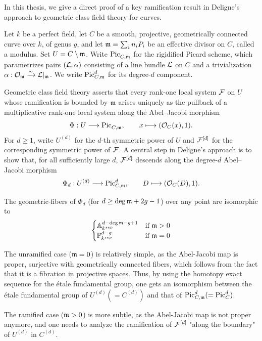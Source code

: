 In this thesis, we give a direct proof of a key ramification result in Deligne's approach to geometric class field theory for curves.

Let $k$ be a perfect field, let $C$ be a smooth, projective, geometrically connected curve over $k$, of genus $g$, and let $\mdls=\sum_i n_iP_i$ be an effective divisor on $C$, called a modulus. Set $U=C\setminus\mdls$.
Write $\PicCm$ for the rigidified Picard scheme, which parametrizes pairs $(\cL,\alpha)$ consisting of a line bundle $\cL$ on $C$ and a trivialization $\alpha:\cO_\mdls\xrightarrow{\sim}\cL|_\mdls$. We write $\PicCm[d]$ for its degree-$d$ component.

Geometric class field theory asserts that every rank-one local system $\cF$ on $U$ whose ramification is bounded by $\mdls$ arises uniquely as the pullback of a multiplicative rank-one local system along the Abel--Jacobi morphism
\[
\Phi:U\longrightarrow\PicCm,
\qquad x\longmapsto(\cO_C(x),1).
\]
For $d\geq1$, write $U^{(d)}$ for the $d$-th symmetric power of $U$ and $\cF^{[d]}$ for the corresponding symmetric power of $\cF$.
A central step in Deligne's approach is to show that, for all sufficiently large $d$, $\cF^{[d]}$ descends along the degree-$d$ Abel--Jacobi morphism
\[
\Phi_d:U^{(d)}\longrightarrow\PicCm[d],
\qquad D\longmapsto(\cO_C(D),1).
\]

The geometric-fibers of $\Phi_d$ (for $d \geq \deg \mdls +  2g - 1$) over any point are isomorphic to 
$$
\begin{cases}
\mathbb{A}_{k^{sep}}^{d - \deg \mdls - g + 1} & \text{if } \mdls > 0 \\
\mathbb{P}_{k^{sep}}^{d - g} & \text{if } \mdls = 0
\end{cases}
$$

The unramified case ($\mdls = 0$) is relatively simple, as the Abel-Jacobi map is proper, surjective with geometrically connected fibers, which follows from the fact that it is a fibration in projective spaces.
Thus, by using the homotopy exact sequence for the \'etale fundamental group,
one gets an isomorphism between the \'etale fundamental group of $U^{(d)} (=C^{(d)})$ and that of $\PicCm[d] (=\PicC[d])$.

The ramified case ($\mdls > 0$) is more subtle, as the Abel-Jacobi map is not proper anymore, and one needs to analyze the ramification of $\cF^{[d]}$ "along the boundary" of $U^{(d)}$ in $C^{(d)}$.

